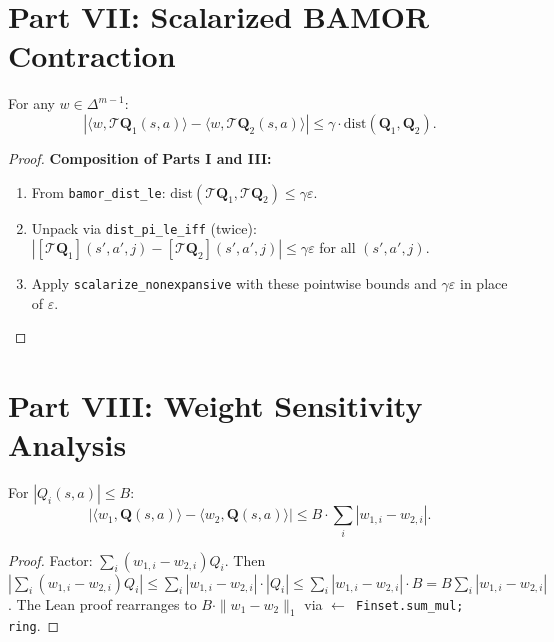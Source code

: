 \section{Part VII: Scalarized BAMOR Contraction}
\label{app:scalarized_contraction}

\begin{theorem}
For any $w \in \Delta^{m-1}$:
\begin{equation}
    |\langle w, \mathcal{T}\mathbf{Q}_1(s,a) \rangle - \langle w, \mathcal{T}\mathbf{Q}_2(s,a) \rangle| \le \gamma \cdot \mathrm{dist}(\mathbf{Q}_1, \mathbf{Q}_2).
\end{equation}
\end{theorem}
\begin{proof}
\textbf{Composition of Parts I and III:}
\begin{enumerate}
    \item From \texttt{bamor\_dist\_le}: $\mathrm{dist}(\mathcal{T}\mathbf{Q}_1, \mathcal{T}\mathbf{Q}_2) \le \gamma\varepsilon$.
    \item Unpack via \texttt{dist\_pi\_le\_iff} (twice): $|[\mathcal{T}\mathbf{Q}_1](s',a',j) - [\mathcal{T}\mathbf{Q}_2](s',a',j)| \le \gamma\varepsilon$ for all $(s',a',j)$.
    \item Apply \texttt{scalarize\_nonexpansive} with these pointwise bounds and $\gamma\varepsilon$ in place of $\varepsilon$.
\end{enumerate}
\end{proof}


\section{Part VIII: Weight Sensitivity Analysis}
\label{app:weight_sensitivity}

\begin{lemma}
For $|Q_i(s,a)| \le B$:
\begin{equation}
    |\langle w_1, \mathbf{Q}(s,a) \rangle - \langle w_2, \mathbf{Q}(s,a) \rangle| \le B \cdot \sum_i |w_{1,i} - w_{2,i}|.
\end{equation}
\end{lemma}
\begin{proof}
Factor: $\sum_i (w_{1,i} - w_{2,i}) Q_i$.  Then $|\sum_i (w_{1,i} - w_{2,i}) Q_i| \le \sum_i |w_{1,i} - w_{2,i}| \cdot |Q_i| \le \sum_i |w_{1,i} - w_{2,i}| \cdot B = B \sum_i |w_{1,i} - w_{2,i}|$.  The Lean proof rearranges to $B \cdot \|w_1 - w_2\|_1$ via \texttt{$\leftarrow$ Finset.sum\_mul; ring}.
\end{proof}

